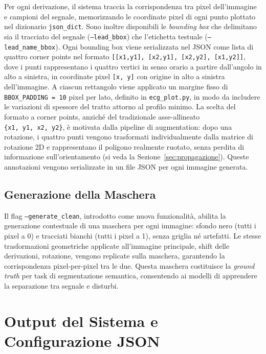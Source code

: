 Per ogni derivazione, il sistema traccia la corrispondenza tra pixel dell'immagine e campioni del segnale, memorizzando le coordinate pixel di ogni punto plottato nel dizionario \texttt{json\_dict}. Sono inoltre disponibili le \textit{bounding box} che delimitano sia il tracciato del segnale (\texttt{--lead\_bbox}) che l'etichetta testuale (\texttt{--lead\_name\_bbox}). Ogni bounding box viene serializzata nel JSON come lista di quattro corner points nel formato \texttt{[[x1,y1],~[x2,y1],~[x2,y2],~[x1,y2]]}, dove i punti rappresentano i quattro vertici in senso orario a partire dall'angolo in alto a sinistra, in coordinate pixel \texttt{[x,~y]} con origine in alto a sinistra dell'immagine. A ciascun rettangolo viene applicato un margine fisso di \texttt{BBOX\_PADDING = 10} pixel per lato, definito in \texttt{ecg\_plot.py}, in modo da includere le variazioni di spessore del tratto attorno al profilo minimo. La scelta del formato a corner points, anziché del tradizionale asse-allineato \texttt{\{x1,~y1,~x2,~y2\}}, è motivata dalla pipeline di augmentation: dopo una rotazione, i quattro punti vengono trasformati individualmente dalla matrice di rotazione 2D e rappresentano il poligono realmente ruotato, senza perdita di informazione sull'orientamento (si veda la Sezione~\ref{sec:propagazione}). Queste annotazioni vengono serializzate in un file JSON per ogni immagine generata.

\subsection{Generazione della Maschera}

Il flag \texttt{--generate\_clean}, introdotto come nuova funzionalità, abilita la generazione contestuale di una maschera per ogni immagine: sfondo nero (tutti i pixel a 0) e tracciati bianchi (tutti i pixel a 1), senza griglia né artefatti. Le stesse trasformazioni geometriche applicate all'immagine principale, shift delle derivazioni, rotazione, vengono replicate sulla maschera, garantendo la corrispondenza pixel-per-pixel tra le due. Questa maschera costituisce la \textit{ground truth} per task di segmentazione semantica, consentendo ai modelli di apprendere la separazione tra segnale e disturbi.

\section{Output del Sistema e Configurazione JSON}\label{sec:output}

